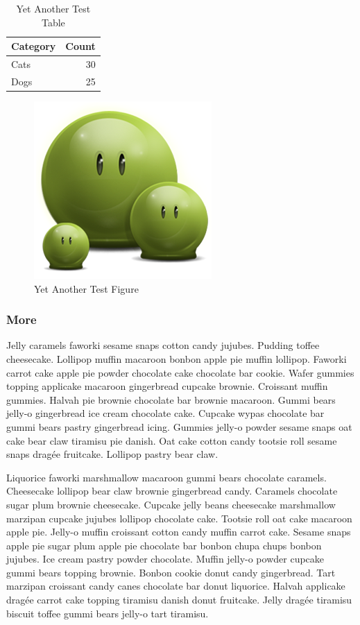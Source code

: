 \begin{table}[hbt!]
   \centering
   \caption{Yet Another Test Table}
   \label{tab:dummy}
   \begin{tabular}{l r}
      \hline
      Category & Count\\
      \hline
      Cats & 30\\
      Dogs & 25\\
      \hline
   \end{tabular}
\end{table}

\begin{figure}[hbt!]\centering
   \includegraphics[width=.3\textwidth]{green} 
   \caption{Yet Another Test Figure}
   \label{fig:dummy}
\end{figure}


\subsubsection{More}

Jelly caramels faworki sesame snaps cotton candy jujubes. Pudding toffee cheesecake. Lollipop muffin macaroon bonbon apple pie muffin lollipop. Faworki carrot cake apple pie powder chocolate cake chocolate bar cookie. Wafer gummies topping applicake macaroon gingerbread cupcake brownie. Croissant muffin gummies. Halvah pie brownie chocolate bar brownie macaroon. Gummi bears jelly-o gingerbread ice cream chocolate cake. Cupcake wypas chocolate bar gummi bears pastry gingerbread icing. Gummies jelly-o powder sesame snaps oat cake bear claw tiramisu pie danish. Oat cake cotton candy tootsie roll sesame snaps dragée fruitcake. Lollipop pastry bear claw.

Liquorice faworki marshmallow macaroon gummi bears chocolate caramels. Cheesecake lollipop bear claw brownie gingerbread candy. Caramels chocolate sugar plum brownie cheesecake. Cupcake jelly beans cheesecake marshmallow marzipan cupcake jujubes lollipop chocolate cake. Tootsie roll oat cake macaroon apple pie. Jelly-o muffin croissant cotton candy muffin carrot cake. Sesame snaps apple pie sugar plum apple pie chocolate bar bonbon chupa chups bonbon jujubes. Ice cream pastry powder chocolate. Muffin jelly-o powder cupcake gummi bears topping brownie. Bonbon cookie donut candy gingerbread. Tart marzipan croissant candy canes chocolate bar donut liquorice. Halvah applicake dragée carrot cake topping tiramisu danish donut fruitcake. Jelly dragée tiramisu biscuit toffee gummi bears jelly-o tart tiramisu.

